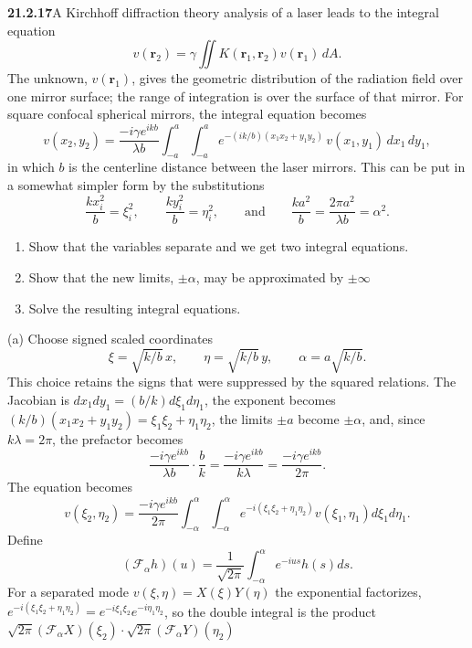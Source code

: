 \par\bigskip
\noindent\textbf{21.2.17}\quad A Kirchhoff diffraction theory
analysis of a laser leads to the integral equation
\[
v(\mathbf{r}_{2})=\gamma\iint
K(\mathbf{r}_{1},\mathbf{r}_{2})v(\mathbf{r}_{1})\,dA.
\]
The unknown, $v(\mathbf{r}_{1})$, gives the geometric distribution
of the radiation field over one mirror surface; the range of
integration is over the surface of that mirror. For square
confocal spherical mirrors, the integral equation becomes
\[
v(x_{2},y_{2})=\frac{-i\gamma e^{ikb}}{\lambda b}
\int_{-a}^{a}\!\!\int_{-a}^{a}
e^{-(ik/b)(x_{1}x_{2}+y_{1}y_{2})}\,v(x_{1},y_{1})\,dx_{1}\,dy_{1},
\]
in which $b$ is the centerline distance between the laser mirrors.
This can be put in a somewhat simpler form by the substitutions
\[
\frac{kx_{i}^{2}}{b}=\xi_{i}^{2},\qquad
\frac{ky_{i}^{2}}{b}=\eta_{i}^{2},\qquad\text{and}\qquad
\frac{ka^{2}}{b}=\frac{2\pi a^{2}}{\lambda b}=\alpha^{2}.
\]
\begin{enumerate}
\item[(a)] Show that the variables separate and we get two
integral equations.
\item[(b)] Show that the new limits, $\pm\alpha$, may be
approximated by $\pm\infty$ 
\item[(c)] Solve the resulting integral equations.
\end{enumerate}
\solution
(a) Choose signed scaled coordinates
\[
\xi=\sqrt{k/b}\,x,\qquad \eta=\sqrt{k/b}\,y,\qquad
\alpha=a\sqrt{k/b}.
\]
This choice retains the signs that were suppressed by the squared
relations. The Jacobian is $dx_1dy_1=(b/k)d\xi_1d\eta_1$, the exponent
becomes $(k/b)(x_1x_2+y_1y_2)=\xi_1\xi_2+\eta_1\eta_2$, the limits
$\pm a$ become $\pm\alpha$, and, since $k\lambda=2\pi$, the prefactor
becomes
\[
\frac{-i\gamma e^{ikb}}{\lambda b}\cdot\frac bk
=\frac{-i\gamma e^{ikb}}{k\lambda}
=\frac{-i\gamma e^{ikb}}{2\pi}.
\]
The equation becomes
\[
v(\xi_2,\eta_2)=\frac{-i\gamma e^{ikb}}{2\pi}
\int_{-\alpha}^{\alpha}\!\!\int_{-\alpha}^{\alpha}
e^{-i(\xi_1\xi_2+\eta_1\eta_2)}
v(\xi_1,\eta_1)d\xi_1d\eta_1.
\]
Define
\[
(\mathcal F_\alpha h)(u)=\frac1{\sqrt{2\pi}}
\int_{-\alpha}^{\alpha}e^{-ius}h(s)ds.
\]
For a separated mode $v(\xi,\eta)=X(\xi)Y(\eta)$ the exponential
factorizes, $e^{-i(\xi_1\xi_2+\eta_1\eta_2)}=e^{-i\xi_1\xi_2}e^{-i\eta_1\eta_2}$,
so the double integral is the product
$\sqrt{2\pi}(\mathcal F_\alpha X)(\xi_2)\cdot\sqrt{2\pi}(\mathcal F_\alpha Y)(\eta_2)$
